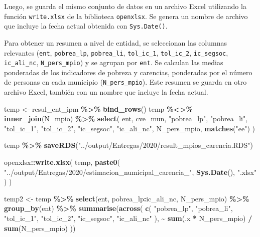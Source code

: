\documentclass[
  12pt,
]{book}
\newenvironment{Shaded}{\begin{snugshade}}{\end{snugshade}}
\newcommand{\FunctionTok}[1]{\textcolor[rgb]{0.13,0.29,0.53}{\textbf{#1}}}
\newcommand{\NormalTok}[1]{#1}
\newcommand{\OtherTok}[1]{\textcolor[rgb]{0.56,0.35,0.01}{#1}}
\newcommand{\SpecialCharTok}[1]{\textcolor[rgb]{0.81,0.36,0.00}{\textbf{#1}}}
\newcommand{\StringTok}[1]{\textcolor[rgb]{0.31,0.60,0.02}{#1}}
\begin{document}
Luego, se guarda el mismo conjunto de datos en un archivo Excel utilizando la función \texttt{write.xlsx} de la biblioteca \texttt{openxlsx}. Se genera un nombre de archivo que incluye la fecha actual obtenida con \texttt{Sys.Date()}.

Para obtener un resumen a nivel de entidad, se seleccionan las columnas relevantes (\texttt{ent}, \texttt{pobrea\_lp}, \texttt{pobrea\_li}, \texttt{tol\_ic\_1}, \texttt{tol\_ic\_2}, \texttt{ic\_segsoc}, \texttt{ic\_ali\_nc}, \texttt{N\_pers\_mpio}) y se agrupan por \texttt{ent}. Se calculan las medias ponderadas de los indicadores de pobreza y carencias, ponderadas por el número de personas en cada municipio (\texttt{N\_pers\_mpio}). Este resumen se guarda en otro archivo Excel, también con un nombre que incluye la fecha actual.

\begin{Shaded}
\begin{Highlighting}[]
\NormalTok{temp }\OtherTok{\textless{}{-}}\NormalTok{ resul\_ent\_ipm }\SpecialCharTok{\%\textgreater{}\%} \FunctionTok{bind\_rows}\NormalTok{()}
\NormalTok{temp }\SpecialCharTok{\%\textless{}\textgreater{}\%} \FunctionTok{inner\_join}\NormalTok{(N\_mpio) }\SpecialCharTok{\%\textgreater{}\%}
  \FunctionTok{select}\NormalTok{(}
\NormalTok{    ent,}
\NormalTok{    cve\_mun,}
    \StringTok{"pobrea\_lp"}\NormalTok{,}
    \StringTok{"pobrea\_li"}\NormalTok{,}
    \StringTok{"tol\_ic\_1"}\NormalTok{,}
    \StringTok{"tol\_ic\_2"}\NormalTok{,}
    \StringTok{"ic\_segsoc"}\NormalTok{,}
    \StringTok{"ic\_ali\_nc"}\NormalTok{,}
\NormalTok{    N\_pers\_mpio,}
    \FunctionTok{matches}\NormalTok{(}\StringTok{"ee"}\NormalTok{)}
\NormalTok{  )}

\NormalTok{temp }\SpecialCharTok{\%\textgreater{}\%} \FunctionTok{saveRDS}\NormalTok{(}\StringTok{"../output/Entregas/2020/result\_mpios\_carencia.RDS"}\NormalTok{)}

\NormalTok{openxlsx}\SpecialCharTok{::}\FunctionTok{write.xlsx}\NormalTok{(}
\NormalTok{  temp,}
  \FunctionTok{paste0}\NormalTok{(}
    \StringTok{"../output/Entregas/2020/estimacion\_numicipal\_carencia\_"}\NormalTok{,}
    \FunctionTok{Sys.Date}\NormalTok{(),}
    \StringTok{".xlsx"}
\NormalTok{  )}
\NormalTok{)}

\NormalTok{temp2 }\OtherTok{\textless{}{-}}\NormalTok{ temp }\SpecialCharTok{\%\textgreater{}\%}
  \FunctionTok{select}\NormalTok{(ent, pobrea\_lp}\SpecialCharTok{:}\NormalTok{ic\_ali\_nc, N\_pers\_mpio) }\SpecialCharTok{\%\textgreater{}\%}
  \FunctionTok{group\_by}\NormalTok{(ent) }\SpecialCharTok{\%\textgreater{}\%}
  \FunctionTok{summarise}\NormalTok{(}\FunctionTok{across}\NormalTok{(}
    \FunctionTok{c}\NormalTok{(}
      \StringTok{"pobrea\_lp"}\NormalTok{,}
      \StringTok{"pobrea\_li"}\NormalTok{,}
      \StringTok{"tol\_ic\_1"}\NormalTok{,}
      \StringTok{"tol\_ic\_2"}\NormalTok{,}
      \StringTok{"ic\_segsoc"}\NormalTok{,}
      \StringTok{"ic\_ali\_nc"}
\NormalTok{    ),}
    \SpecialCharTok{\textasciitilde{}} \FunctionTok{sum}\NormalTok{(.x }\SpecialCharTok{*}\NormalTok{ N\_pers\_mpio) }\SpecialCharTok{/} \FunctionTok{sum}\NormalTok{(N\_pers\_mpio)}
\NormalTok{  ))}


\end{Highlighting}
\end{Shaded}
\end{document}
